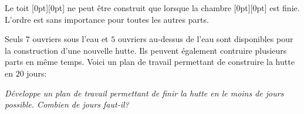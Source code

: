 {\begin{adjustwidth}{1.5em}{0em}
\end{adjustwidth}

Le toit \raisebox{-0.5ex}[0pt][0pt]{} ne peut être construit que lorsque la chambre \raisebox{-0.5ex}[0pt][0pt]{} est finie. L’ordre est sans importance pour toutes les autres parts.

Seuls $7$ ouvriers sous l’eau et $5$ ouvriers au-dessus de l’eau sont disponibles pour la construction d’une nouvelle hutte. Ils peuvent également contruire plusieurs parts en même temps. Voici un plan de travail permettant de construire la hutte en $20$ jours:

{\centering%
\par}



{\em
Développe un plan de travail permettant de finir la hutte en le moins de jours possible. Combien de jours faut-il?


}





}
